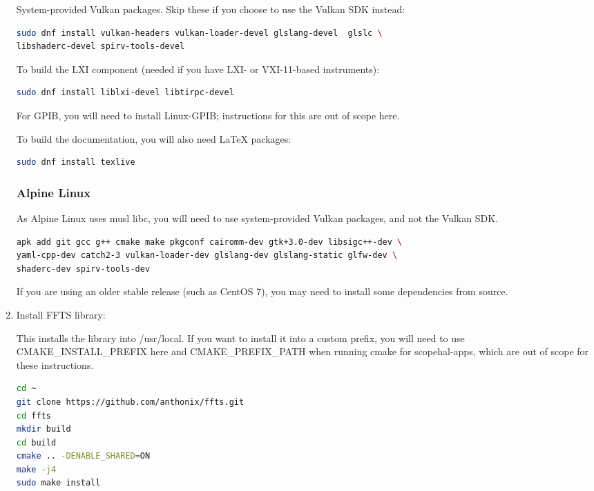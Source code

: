 \begin{enumerate}
System-provided Vulkan packages. Skip these if you choose to use the Vulkan SDK instead:
\begin{lstlisting}[language=sh, numbers=none]
sudo dnf install vulkan-headers vulkan-loader-devel glslang-devel  glslc \
libshaderc-devel spirv-tools-devel
\end{lstlisting}

To build the LXI component (needed if you have LXI- or VXI-11-based instruments):
\begin{lstlisting}[language=sh, numbers=none]
sudo dnf install liblxi-devel libtirpc-devel
\end{lstlisting}

For GPIB, you will need to install Linux-GPIB; instructions for this are out of scope here.

To build the documentation, you will also need LaTeX packages:
\begin{lstlisting}[language=sh, numbers=none]
sudo dnf install texlive
\end{lstlisting}

\subsubsection{Alpine Linux}

As Alpine Linux uses musl libc, you will need to use system-provided Vulkan packages, and not the Vulkan SDK.
\begin{lstlisting}[language=sh, numbers=none]
apk add git gcc g++ cmake make pkgconf cairomm-dev gtk+3.0-dev libsigc++-dev \
yaml-cpp-dev catch2-3 vulkan-loader-dev glslang-dev glslang-static glfw-dev \
shaderc-dev spirv-tools-dev
\end{lstlisting}

If you are using an older stable release (such as CentOS 7), you may need to install some dependencies from source.


\item Install FFTS library:

This installs the library into /usr/local. If you want to install it into a custom prefix, you will need to use
CMAKE\_INSTALL\_PREFIX here and CMAKE\_PREFIX\_PATH when running cmake for scopehal-apps, which are out of scope
for these instructions.

\begin{lstlisting}[language=sh, numbers=none]
cd ~
git clone https://github.com/anthonix/ffts.git
cd ffts
mkdir build
cd build
cmake .. -DENABLE_SHARED=ON
make -j4
sudo make install
\end{lstlisting}


\end{enumerate}
